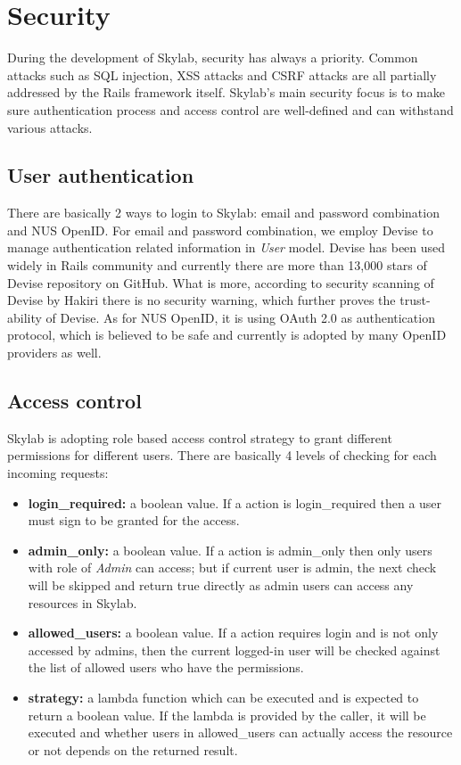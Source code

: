 \chapter{Security} \label{security}

During the development of Skylab, security has always a priority. Common attacks such as SQL injection, XSS attacks and CSRF attacks are all partially addressed by the Rails framework itself. Skylab's main security focus is to make sure authentication process and access control are well-defined and can withstand various attacks.

\section{User authentication}

There are basically 2 ways to login to Skylab: email and password combination and NUS OpenID. For email and password combination, we employ Devise to manage authentication related information in \textit{User} model. Devise has been used widely in Rails community and currently there are more than 13,000 stars of Devise repository on GitHub\cite{citationdevise}. What is more, according to security scanning of Devise by Hakiri there is no security warning, which further proves the trust-ability of Devise\cite{citationdevisehakiri}. As for NUS OpenID, it is using OAuth 2.0 as authentication protocol, which is believed to be safe and currently is adopted by many OpenID providers as well\cite{citationnusopenid}.

\section{Access control}

Skylab is adopting role based access control strategy to grant different permissions for different users. There are basically 4 levels of checking for each incoming requests:

\begin{itemize}
  \item \textbf{login\_required:} a boolean value. If a action is login\_required then a user must sign to be granted for the access.
  \item \textbf{admin\_only:} a boolean value. If a action is admin\_only then only users with role of \textit{Admin} can access; but if current user is admin, the next check will be skipped and return true directly as admin users can access any resources in Skylab.
  \item \textbf{allowed\_users:} a boolean value. If a action requires login and is not only accessed by admins, then the current logged-in user will be checked against the list of allowed users who have the permissions.
  \item \textbf{strategy:} a lambda function which can be executed and is expected to return a boolean value. If the lambda is provided by the caller, it will be executed and whether users in allowed\_users can actually access the resource or not depends on the returned result.
\end{itemize}

